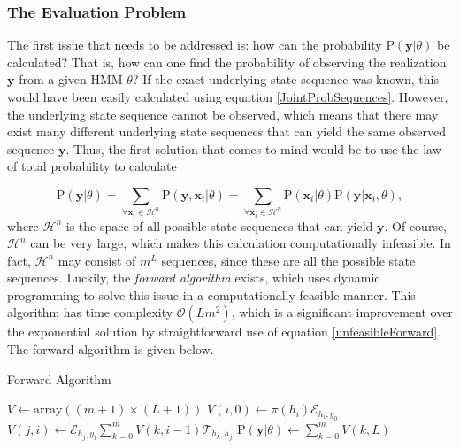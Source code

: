 \documentclass{article}\usepackage[]{graphicx}\usepackage[]{color}
\begin{document}
\subsubsection{The Evaluation Problem}
The first issue that needs to be addressed is: how can the probability $\text{P}(\mathbf{y}|\theta)$ be calculated? That is, how can one find the probability of observing the realization $\mathbf{y}$ from a given HMM $\theta$? If the exact underlying state sequence was known, this would have been easily calculated using equation \eqref{JointProbSequences}. However, the underlying state sequence cannot be observed, which means that there may exist many different underlying state sequences that can yield the same observed sequence $\mathbf{y}$. Thus, the first solution that comes to mind would be to use the law of total probability to calculate

\begin{equation}
    \text{P}(\textbf{y}|\theta) = \sum_{\forall\textbf{x}_i \in \mathcal{H}^n} \text{P}(\textbf{y}, \textbf{x}_i|\theta) = \sum_{\forall\textbf{x}_i \in \mathcal{H}^n} \text{P}(\mathbf{x}_i|\theta)\text{P}(\mathbf{y}|\mathbf{x}_i,\theta), 
\label{unfeasibleForward}
\end{equation}
where $\mathcal{H}^n$ is the space of all possible state sequences that can yield $\mathbf{y}$. Of course, $\mathcal{H}^n$ can be very large, which makes this calculation computationally infeasible. In fact, $\mathcal{H}^n$ may consist of $m^L$ sequences, since these are all the possible state sequences. Luckily, the \textit{forward algorithm} exists, which uses dynamic programming to solve this issue in a computationally feasible manner. This algorithm has time complexity $\mathcal{O}(Lm^2)$, which is a significant improvement over the exponential solution by straightforward use of equation \eqref{unfeasibleForward}. The forward algorithm is given below.  

\begin{algorithm}
    \caption{Forward Algorithm}\label{alg:Forward}
    \begin{algorithmic}
        \STATE $V \gets \text{array}((m+1) \times (L+1))$
            \STATE $V(i,0) \gets \pi(h_{i}) \mathcal{E}_{h_{i},y_0}$
        \ENDFOR
                \STATE $V(j,i) \gets \mathcal{E}_{h_{j}, y_i}\sum_{k=0}^{m}V(k, i-1)\mathcal{T}_{h_{k},h_{j}} $
            \ENDFOR
        \ENDFOR
        \RETURN $\text{P}(\mathbf{y}|\theta) \gets \sum_{k=0}^{m}V(k,L)$
    \end{algorithmic} 
\end{algorithm}
\end{document}
